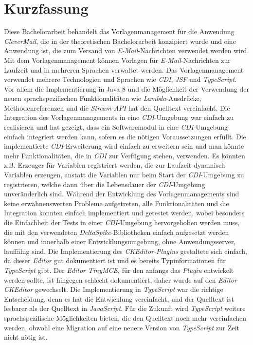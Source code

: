 \chapter{Kurzfassung}
Diese Bachelorarbeit behandelt das Vorlagenmanagement für die Anwendung \emph{CleverMail}, die in der theoretischen Bachelorarbeit konzipiert wurde und eine Anwendung ist, die zum Versand von \emph{E-Mail}-Nachrichten verwendet werden wird. Mit dem Vorlagenmanagement können Vorlagen für \emph{E-Mail}-Nachrichten zur Laufzeit und in mehreren Sprachen verwaltet werden.
\newline
\newline
Das Vorlagenmanagement verwendet mehrere Technologien und Sprachen wie \emph{CDI}, \emph{JSF} und \emph{TypeScript}. Vor allem die Implementierung in Java 8 und die Möglichkeit der Verwendung der neuen sprachspezifischen Funktionalitäten wie \emph{Lambda}-Ausdrücke, Methodenreferenzen und die \emph{Stream-API} hat den Quelltext vereinfacht.
\newline
\newline
Die Integration des Vorlagenmanagements in eine \emph{CDI}-Umgebung war einfach zu realisieren und hat gezeigt, dass ein Softwaremodul in eine \emph{CDI}-Umgebung einfach integriert werden kann, sofern es die nötigen Voraussetzungen erfüllt. Die implementierte \emph{CDI}-Erweiterung wird einfach zu erweitern sein und man könnte mehr Funktionalitäten, die in \emph{CDI} zur Verfügung stehen, verwenden. Es könnten z.B. Erzeuger für Variablen registriert werden, die zur Laufzeit dynamisch Variablen erzeugen, anstatt die Variablen nur beim Start der \emph{CDI}-Umgebung zu registrieren, welche dann über die Lebensdauer der \emph{CDI}-Umgebung  unveränderlich sind. 
\newline
\newline
Während der Entwicklung des Vorlagenmanagements sind keine erwähnenswerten Probleme aufgetreten, alle Funktionalitäten und die Integration konnten einfach implementiert und getestet werden, wobei besonders die Einfachheit der Tests in einer \emph{CDI}-Umgebung hervorgehoben werden muss, die mit den verwendeten \emph{DeltaSpike}-Bibliotheken einfach aufgesetzt werden können und innerhalb einer Entwicklungsumgebung, ohne Anwendungsserver, lauffähig sind.
\newline
\newline
Die Implementierung des \emph{CKEditor-Plugins} gestaltete sich einfach, da dieser \emph{Editor} gut dokumentiert ist und es bereits Typinformationen für \emph{TypeScript} gibt. Der \emph{Editor TinyMCE}, für den anfangs das \emph{Plugin} entwickelt werden sollte, ist hingegen schlecht dokumentiert, daher wurde auf den \emph{Editor CKEditor} gewechselt. Die Implementierung in \emph{TypeScript} war die richtige Entscheidung, denn es hat die Entwicklung vereinfacht, und der Quelltext ist lesbarer als der Quelltext in \emph{JavaScript}. Für die Zukunft wird \emph{TypeScript} weitere sprachspezifische Möglichkeiten bieten, die den Quelltext noch mehr vereinfachen werden, obwohl eine Migration auf eine neuere Version von \emph{TypeScript} zur Zeit nicht nötig ist.